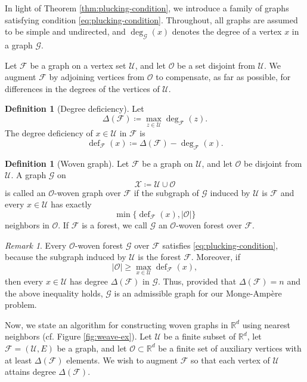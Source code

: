 \documentclass[reqno,11pt]{amsart}
\numberwithin{equation}{section}
\theoremstyle{definition}
\newtheorem{definition}[theorem]{Definition}
\theoremstyle{remark}
\newtheorem{remark}[theorem]{Remark}
\begin{document}
In light of Theorem \ref{thm:plucking-condition}, we introduce a family of graphs satisfying condition \eqref{eq:plucking-condition}. Throughout, all graphs are assumed to be simple and undirected, and $\operatorname{deg}_{\mathcal G}(x)$ denotes the degree of a vertex $x$ in a graph $\mathcal G$.

Let $\mathcal F$ be a graph on a vertex set $\mathcal U$, and let $\mathcal O$ be a set disjoint from $\mathcal U$. We augment $\mathcal F$ by adjoining vertices from $\mathcal O$ to compensate, as far as possible, for differences in the degrees of the vertices of $\mathcal U$.

\begin{definition}[Degree deficiency]
Let
\[
\Delta(\mathcal F)
\coloneqq
\max_{z\in\mathcal U}\operatorname{deg}_{\mathcal F}(z).
\]
The degree deficiency of $x\in\mathcal U$ in $\mathcal F$ is
\[
\operatorname{def}_{\mathcal F}(x)
\coloneqq
\Delta(\mathcal F)-\operatorname{deg}_{\mathcal F}(x).
\]
\end{definition}

\begin{definition}[Woven graph]
Let $\mathcal F$ be a graph on $\mathcal U$, and let $\mathcal O$ be disjoint from $\mathcal U$. A graph $\mathcal G$ on
\[
\mathcal X\coloneqq\mathcal U\cup\mathcal O
\]
is called an $\mathcal O$-woven graph over $\mathcal F$ if the subgraph of $\mathcal G$ induced by $\mathcal U$ is $\mathcal F$ and every $x\in\mathcal U$ has exactly
\[
\min\bigl\{
\operatorname{def}_{\mathcal F}(x),
|\mathcal O|
\bigr\}
\]
neighbors in $\mathcal O$. If $\mathcal F$ is a forest, we call $\mathcal G$ an $\mathcal O$-woven forest over $\mathcal F$.
\end{definition}

\begin{remark}
Every $\mathcal O$-woven forest $\mathcal{G}$ over $\mathcal F$ satisfies
\eqref{eq:plucking-condition}, because the subgraph induced by
$\mathcal U$ is the forest $\mathcal F$. Moreover, if
\[
    |\mathcal O|
    \ge
    \max_{x\in\mathcal U}\operatorname{def}_{\mathcal F}(x),
\]
then every \(x\in\mathcal U\) has degree \(\Delta(\mathcal F)\) in
\(\mathcal G\). Thus, provided that \(\Delta(\mathcal F)=n\) and the above inequality holds, $\mathcal{G}$ is an admissible graph for our Monge-Amp\`ere problem.
\end{remark}

Now, we state an algorithm for constructing woven graphs in $\mathbb{R}^d$ using nearest neighbors (cf. Figure \ref{fig:weave-ex}). Let $\mathcal{U}$ be a finite subset of $\mathbb{R}^d$, let \(\mathcal{F}=(\mathcal{U},E)\) be a graph, and let \(\mathcal{O}\subset \mathbb{R}^d\) be a finite set of auxiliary vertices with at least $\Delta(\mathcal F)$ elements. We wish to augment \(\mathcal{F}\) so that each vertex of \(\mathcal{U}\) attains degree \(\Delta(\mathcal F)\).
\end{document}
